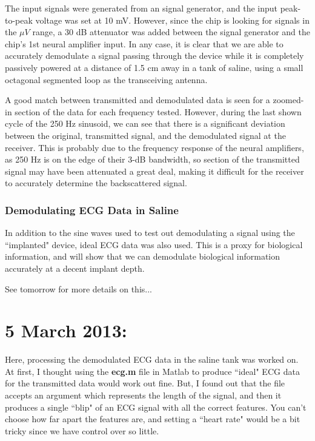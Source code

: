 \documentclass[12pt,onecolumn,titlepage]{article}
\begin{document}
The input signals were generated from an signal generator, and the input peak-to-peak voltage was set at 10 mV. However, since the chip is looking for signals in the $\mu V$ range, a 30 dB attenuator was added between the signal generator and the chip's 1st neural amplifier input. In any case, it is clear that we are able to accurately demodulate a signal passing through the device while it is completely passively powered at a distance of 1.5 cm away in a tank of saline, using a small octagonal segmented loop as the transceiving antenna.

A good match between transmitted and demodulated data is seen for a zoomed-in section of the data for each frequency tested. However, during the last shown cycle of the 250 Hz sinusoid, we can see that there is a significant deviation between the original, transmitted signal, and the demodulated signal at the receiver. This is probably due to the frequency response of the neural amplifiers, as 250 Hz is on the edge of their 3-dB bandwidth, so section of the transmitted signal may have been attenuated a great deal, making it difficult for the receiver to accurately determine the backscattered signal.


\subsubsection{Demodulating ECG Data in Saline}
\indent \indent In addition to the sine waves used to test out demodulating a signal using the ``implanted" device, ideal ECG data was also used. This is a proxy for biological information, and will show that we can demodulate biological information accurately at a decent implant depth. 

See tomorrow for more details on this...



\clearpage
\section{5 March 2013:}

\indent \indent Here, processing the demodulated ECG data in the saline tank was worked on. At first, I thought using the {\bf{ecg.m}} file in Matlab to produce ``ideal" ECG data for the transmitted data would work out fine. But, I found out that the file accepts an argument which represents the length of the signal, and then it produces a single ``blip" of an ECG signal with all the correct features. You can't choose how far apart the features are, and setting a ``heart rate" would be a bit tricky since we have control over so little.
\end{document}
